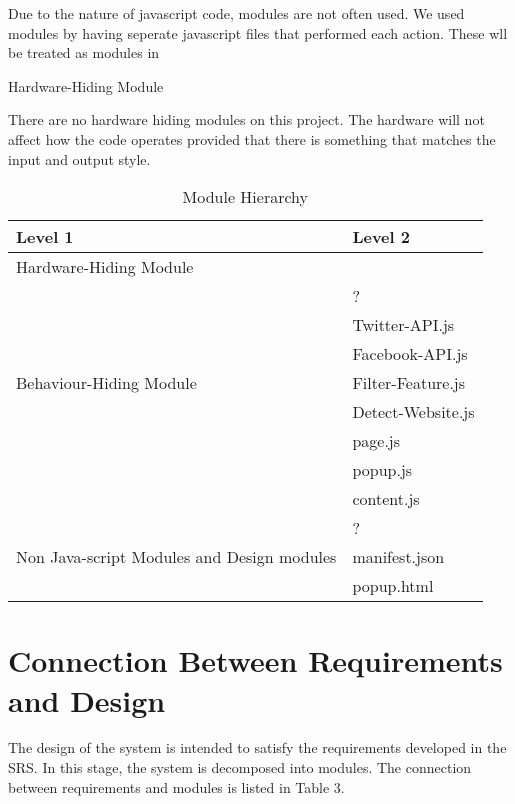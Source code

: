 \documentclass[12pt, titlepage]{article}
\newcounter{mnum}
\newcommand{\mthemnum}{M\themnum}
\begin{document}
Due to the nature of javascript code, modules are not often used. We used modules by having seperate javascript files that performed each action. These wll be treated as modules in 
\begin{description}
\item [ \mthemnum \label{mHH}:] Hardware-Hiding Module
\item There are no hardware hiding modules on this project. The hardware will not affect how the code operates provided that there is something that matches the input and output style. 
\end{description}
\begin{table}[h!]
\centering
\begin{tabular}{p{} p{}}
\toprule
\textbf{Level 1} & \textbf{Level 2}\\
\midrule
{Hardware-Hiding Module} & ~ \\
\midrule
\multirow{7}{0.3\textwidth}{Behaviour-Hiding Module} & ?\\
& Twitter-API.js\\
& Facebook-API.js\\
&Filter-Feature.js\\
&Detect-Website.js\\
& page.js\\
& popup.js\\
& content.js\\
\midrule
\multirow{3}{0.3\textwidth}{Non Java-script Modules and Design modules} & {?}\\
& manifest.json\\
& popup.html \\
\bottomrule
\end{tabular}
\caption{Module Hierarchy}
\label{TblMH}
\end{table}
\section{Connection Between Requirements and Design} \label{SecConnection}
The design of the system is intended to satisfy the requirements developed in
the SRS. In this stage, the system is decomposed into modules. The connection
between requirements and modules is listed in Table 3.
\end{document}
